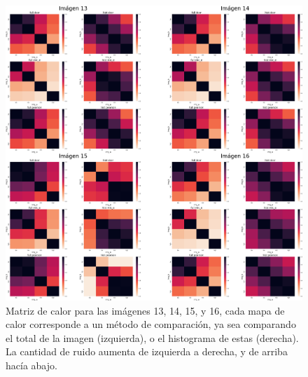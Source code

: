 \begin{figure}
    \centering
    \includegraphics[width=\textwidth]{figuras/heatmaps/heatmaps_app_3.png}
    \caption{Matriz de calor para las im\'agenes 13, 14, 15, y 16, cada mapa de calor corresponde a un m\'etodo de comparaci\'on, ya sea comparando el total de la imagen (izquierda), o el histograma de estas (derecha). La cantidad de ruido aumenta de izquierda a derecha, y de arriba hacía abajo.}
\end{figure}


